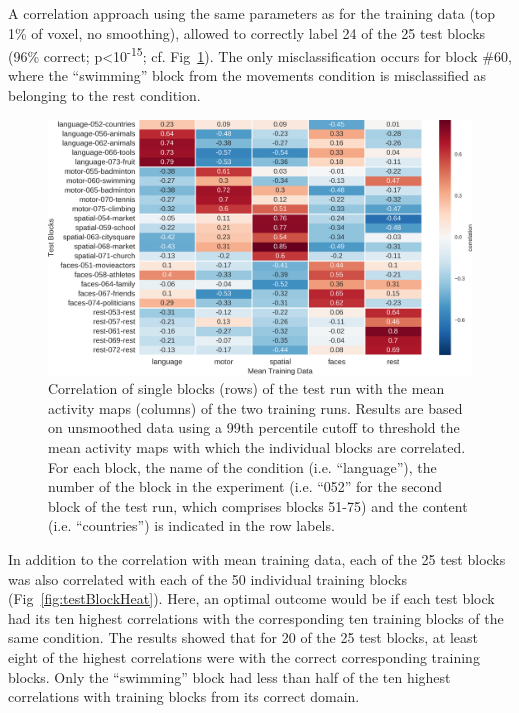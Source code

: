 \documentclass[fleqn,10pt]{SelfArx} %
\begin{document}
A correlation approach using the same parameters as for the training data (top 1\% of voxel, no smoothing), allowed to correctly label 24 of the 25 test blocks (96\% correct; p<10\textsuperscript{-15}; cf. Fig~\ref{fig:testMeanHeat}). The only misclassification occurs for block \#60, where the “swimming” block from the movements condition is misclassified as belonging to the rest condition.
 
\begin{figure}[htbp]
	\begin{minipage}{\textwidth}
		\renewcommand{\familydefault}{\sfdefault}\normalfont
		\centering
		\includegraphics[width=\columnwidth]{./figs/fig7_testMeanHeat.png}
				\vspace*{-3mm}
		\caption{Correlation of single blocks (rows) of the test run with the mean activity maps (columns) of the two training runs. Results are based on unsmoothed data using a 99th percentile cutoff to threshold the mean activity maps with which the individual blocks are correlated. For each block, the name of the condition (i.e. “language”), the number of the block in the experiment (i.e. “052” for the second block of the test run, which comprises blocks 51-75) and the content (i.e. “countries”) is indicated in the row labels.}%
		\label{fig:testMeanHeat}
	\end{minipage}
\end{figure}

In addition to the correlation with mean training data, each of the 25 test blocks was also correlated with each of the 50 individual training blocks (Fig~\ref{fig:testBlockHeat}). Here, an optimal outcome would be if each test block had its ten highest correlations with the corresponding ten training blocks of the same condition. The results showed that for 20 of the 25 test blocks, at least eight of the highest correlations were with the correct corresponding training blocks. Only the “swimming” block had less than half of the ten highest correlations with training blocks from its correct domain.
\end{document}
